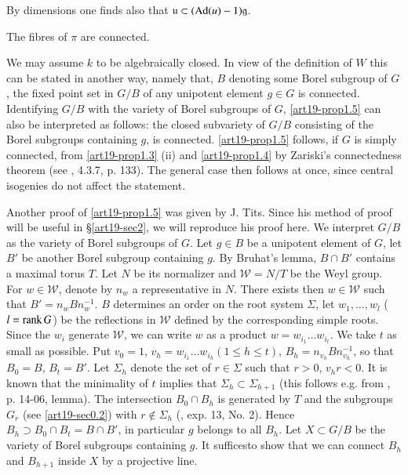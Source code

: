 \begin{remark*}
By dimensions one finds also that $\mathfrak{u}\subset (\operatorname{\mathrm{Ad}} (u)-1)\mathfrak{g}$.
\end{remark*}

\begin{proposition}\label{art19-prop1.5}
The fibres of $\pi$ are connected.
\end{proposition}

We may assume $k$ to be algebraically closed. In view of the definition of $W$ this can be stated in another way, namely that, $B$ denoting some Borel subgroup of $G$, the fixed point set in $G/B$ of any unipotent element $g\in G$ is connected. Identifying $G/B$ with the variety of Borel subgroups of $G$, \ref{art19-prop1.5} can also be interpreted as follows: the closed subvariety of $G/B$ consisting of the Borel subgroups containing $g$, is connected. \ref{art19-prop1.5} follows, if $G$ is simply connected, from \ref{art19-prop1.3} (ii) and \ref{art19-prop1.4} by Zariski's connectedness theorem (see \cite{art19-key7}, 4.3.7, p. 133). The general case then follows at once, since central isogenies do not affect the statement.

Another proof of \ref{art19-prop1.5} was given by J. Tits. Since his method of proof will be useful in \S\ref{art19-sec2}, we will reproduce his proof here. We interpret $G/B$ as the variety of Borel subgroups of $G$. Let $g\in B$ be a unipotent element of $G$, let $B'$ be another Borel subgroup containing $g$. By Bruhat's lemma, $B\cap B'$ contains a maximal torus $T$. Let $N$ be its normalizer and $\mathscr{W}=N/T$ be the Weyl group. For $w\in \mathscr{W}$, denote by $n_{w}$ a representative in $N$. There exists then $w\in \mathscr{W}$ such that $B'=n_{w}Bn^{-1}_{w}$. $B$ determines an order on the root system $\Sigma$, let $w_{1},\ldots,w_{l}$ ($l=\operatorname{\mathrm{rank}} G$) be the reflections in $\mathscr{W}$ defined by the corresponding simple roots. Since the $w_{i}$ generate $\mathscr{W}$, we can write $w$ as a product $w=w_{i_{1}}\ldots w_{i_{t}}$. We take $t$ as small as possible. Put $v_{0}=1$, $v_{h}=w_{i_{1}}\ldots w_{i_{h}}(1\leq h\leq t)$, $B_{h}=n_{v_{h}}Bn^{-1}_{v_{h}}$, so that $B_{0}=B$, $B_{t}=B'$. Let $\Sigma_{h}$ denote the set of $r\in \Sigma$ such that $r>0$, $v_{h}r<0$. It is known that the minimality of $t$ implies that $\Sigma_{h}\subset \Sigma_{h+1}$ (this follows e.g. from \cite{art19-key5}, p. 14-06, lemma). The intersection $B_{0}\cap B_{h}$ is generated by $T$ and the subgroups $G_{r}$ (see \ref{art19-sec0.2}) with $r\not\in \Sigma_{h}$ (\cite{art19-key5}, exp. 13, No. 2). Hence $B_{h}\supset B_{0}\cap B_{t}=B\cap B'$, in particular $g$ belongs to all $B_{h}$. Let $X\subset G/B$ be the variety of Borel subgroups containing $g$. It suffices\pageoriginale to show that we can connect $B_{h}$ and $B_{h+1}$ inside $X$ by a projective line.

